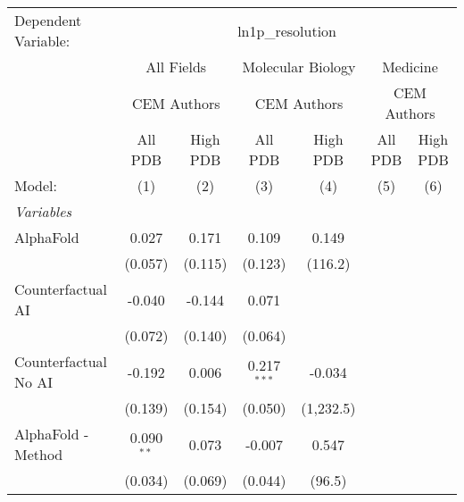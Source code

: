 \begingroup
\centering
\begin{tabular}{lcccccc}
   \tabularnewline \midrule \midrule
   Dependent Variable: & \multicolumn{6}{c}{ln1p\_resolution}\\
 & \multicolumn{2}{c}{All Fields} & \multicolumn{2}{c}{Molecular Biology} & \multicolumn{2}{c}{Medicine} \\
\cmidrule(lr){2-3} \cmidrule(lr){4-5} \cmidrule(lr){6-7}
 & \multicolumn{2}{c}{CEM Authors} & \multicolumn{2}{c}{CEM Authors} & \multicolumn{2}{c}{CEM Authors} \\
\cmidrule(lr){2-3} \cmidrule(lr){4-5} \cmidrule(lr){6-7}
 & \multicolumn{1}{c}{All PDB} & \multicolumn{1}{c}{High PDB} & \multicolumn{1}{c}{All PDB} & \multicolumn{1}{c}{High PDB} & \multicolumn{1}{c}{All PDB} & \multicolumn{1}{c}{High PDB} \\
\cmidrule(lr){2-2} \cmidrule(lr){3-3} \cmidrule(lr){4-4} \cmidrule(lr){5-5} \cmidrule(lr){6-6} \cmidrule(lr){7-7}
   Model:                                                     & (1)            & (2)        & (3)           & (4)       & (5) & (6)\\  
   \midrule
   \emph{Variables}\\
   AlphaFold                                                  & 0.027          & 0.171      & 0.109         & 0.149     &     &   \\   
                                                              & (0.057)        & (0.115)    & (0.123)       & (116.2)   &     &   \\   
   Counterfactual AI                                          & -0.040         & -0.144     & 0.071         &           &     &   \\   
                                                              & (0.072)        & (0.140)    & (0.064)       &           &     &   \\   
   Counterfactual No AI                                       & -0.192         & 0.006      & 0.217$^{***}$ & -0.034    &     &   \\   
                                                              & (0.139)        & (0.154)    & (0.050)       & (1,232.5) &     &   \\   
   AlphaFold - Method                                         & 0.090$^{**}$   & 0.073      & -0.007        & 0.547     &     &   \\   
                                                              & (0.034)        & (0.069)    & (0.044)       & (96.5)    &     &   \\   

\end{tabular}
